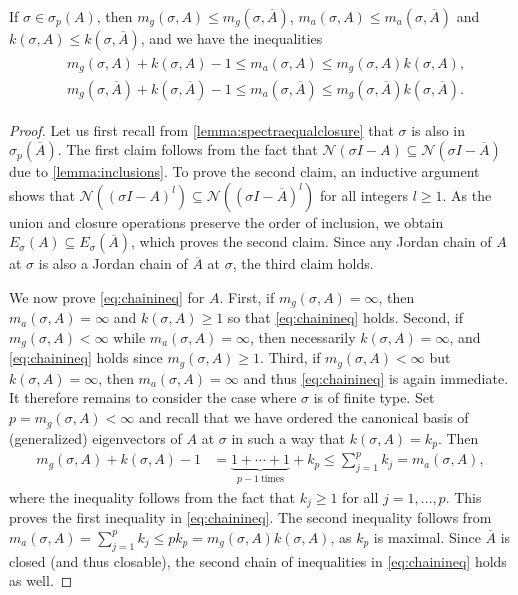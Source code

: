 \documentclass[english]{myarticle}
\begin{document}
\begin{sloppypar}
\begin{lemma} \label{lemma:mgakineq}
If $\sigma \in \sigma_p(A)$, then $m_g(\sigma,A) \leq m_g(\sigma,\overline{A})$, $m_a(\sigma,A) \leq m_a(\sigma,\overline{A})$ and $ k(\sigma,A) \leq k(\sigma,\overline{A})$, and we have the inequalities
\begin{align} 
\begin{split} \label{eq:chainineq}
    &m_g(\sigma,A) + k(\sigma,A) - 1 \leq m_a(\sigma,A) \leq m_g(\sigma,A) k(\sigma,A), \\
    &m_g(\sigma,\overline{A}) + k(\sigma,\overline{A}) - 1 \leq m_a(\sigma,\overline{A}) \leq m_g(\sigma,\overline{A}) k(\sigma,\overline{A}).  
\end{split}
\end{align}   
\end{lemma}
\begin{proof}
Let us first recall from \cref{lemma:spectraequalclosure} that $\sigma$ is also in $\sigma_p(\overline{A})$. The first claim follows from the fact that $\mathcal{N}(\sigma I - A) \subseteq \mathcal{N}(\sigma I - \overline{A})$ due to \cref{lemma:inclusions}. To prove the second claim, an inductive argument shows that $\mathcal{N}((\sigma I -A)^l) \subseteq \mathcal{N}((\sigma I - \overline{A})^l)$ for all integers $l \geq 1$. As the union and closure operations preserve the order of inclusion, we obtain $E_\sigma(A) \subseteq E_\sigma(\overline{A})$, which proves the second claim. Since any Jordan chain of $A$ at $\sigma$ is also a Jordan chain of $\overline{A}$ at $\sigma$, the third claim holds. 

We now prove \eqref{eq:chainineq} for $A$. First, if $m_g(\sigma,A) = \infty$, then $m_a(\sigma,A) = \infty$ and $k(\sigma,A) \geq 1$ so that \eqref{eq:chainineq} holds. Second, if $m_g(\sigma,A) < \infty$ while $m_a(\sigma,A) = \infty$, then necessarily $k(\sigma,A) = \infty$, and \eqref{eq:chainineq} holds since $m_g(\sigma,A) \geq 1$. Third, if $m_g(\sigma,A) < \infty$ but $k(\sigma,A) = \infty$, then $m_a(\sigma,A) = \infty$ and thus \eqref{eq:chainineq} is again immediate. It therefore remains to consider the case where $\sigma$ is of finite type. Set $p = m_g(\sigma,A) < \infty$ and recall that we have ordered the canonical basis of (generalized) eigenvectors of $A$ at $\sigma$ in such a way that $k(\sigma,A) = k_p$. Then
\begin{align*}
m_g(\sigma,A) + k(\sigma,A) - 1
&= \underbrace{1 + \cdots + 1 }_{p-1\ \text{times} }  +  k_p
\leq \sum_{j=1}^p k_j
= m_a(\sigma,A),
\end{align*}
where the inequality follows from the fact that $k_j \geq 1$ for all $j = 1,\dots,p$. This proves the first inequality in \eqref{eq:chainineq}. The second inequality follows from $m_a(\sigma,A) = \sum_{j=1}^p k_j \leq pk_p = m_g(\sigma,A) k(\sigma,A)$, as $k_p$ is maximal. Since $\overline{A}$ is closed (and thus closable), the second chain of inequalities in \eqref{eq:chainineq} holds as well.
\end{proof}


\end{sloppypar}
\end{document}

